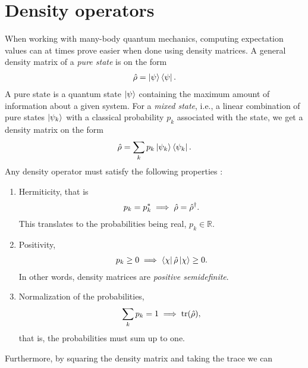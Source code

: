     \section{Density operators}
        \label{sec:density-operators}
        When working with many-body quantum mechanics, computing expectation
        values can at times prove easier when done using density matrices.
        A general density matrix of a \emph{pure state} is on the form
        \begin{align}
            \hat{\rho} = \ket{\psi}\bra{\psi}.
        \end{align}
        A pure state is a quantum state $\ket{\psi}$ containing the maximum
        amount of information about a given system.
        For a \emph{mixed state}, i.e., a linear combination of pure states
        $\ket{\psi_k}$ with a classical probability $p_k$ associated with the
        state, we get a density matrix on the form
        \begin{align}
            \hat{\rho} = \sum_{k} p_k \ket{\psi_k}\bra{\psi_k}.
        \end{align}
        Any density operator must satisfy the following
        properties \cite{modern-qm}:
        \begin{enumerate}
            \item Hermiticity, that is
                \begin{align}
                    p_k = p_k^{*} \implies \hat{\rho} = \hat{\rho}^{\dagger}.
                \end{align}
                This translates to the probabilities being real, $p_k \in
                \mathbb{R}$.
            \item Positivity,
                \begin{align}
                    p_k \geq 0 \implies \bra{\chi}\hat{\rho}\ket{\chi} \geq 0.
                \end{align}
                In other words, density matrices are \emph{positive
                semidefinite}.
            \item Normalization of the probabilities,
                \begin{align}
                    \sum_{k} p_k = 1 \implies \tr(\hat{\rho}),
                \end{align}
                that is, the probabilities must sum up to one.
        \end{enumerate}
        Furthermore, by squaring the density matrix and taking the trace we can
